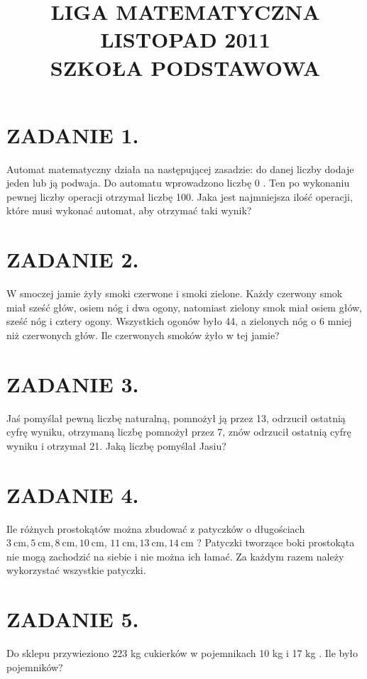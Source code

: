 \documentclass[10pt]{article}
\title{LIGA MATEMATYCZNA \\
 LISTOPAD 2011 \\
 SZKOŁA PODSTAWOWA }
\author{}
\date{}
\begin{document}
\maketitle
\section*{ZADANIE 1.}
Automat matematyczny działa na następującej zasadzie: do danej liczby dodaje jeden lub ją podwaja. Do automatu wprowadzono liczbę 0 . Ten po wykonaniu pewnej liczby operacji otrzymał liczbę 100. Jaka jest najmniejsza ilość operacji, które musi wykonać automat, aby otrzymać taki wynik?

\section*{ZADANIE 2.}
W smoczej jamie żyły smoki czerwone i smoki zielone. Każdy czerwony smok miał sześć głów, osiem nóg i dwa ogony, natomiast zielony smok miał osiem głów, sześć nóg i cztery ogony. Wszystkich ogonów było 44, a zielonych nóg o 6 mniej niż czerwonych głów. Ile czerwonych smoków żyło w tej jamie?

\section*{ZADANIE 3.}
Jaś pomyślał pewną liczbę naturalną, pomnożył ją przez 13, odrzucił ostatnią cyfrę wyniku, otrzymaną liczbę pomnożył przez 7, znów odrzucił ostatnią cyfrę wyniku i otrzymał 21. Jaką liczbę pomyślał Jasiu?

\section*{ZADANIE 4.}
Ile różnych prostokątów można zbudować z patyczków o długościach \(3 \mathrm{~cm}, 5 \mathrm{~cm}, 8 \mathrm{~cm}, 10 \mathrm{~cm}\), \(11 \mathrm{~cm}, 13 \mathrm{~cm}, 14 \mathrm{~cm}\) ? Patyczki tworzące boki prostokąta nie mogą zachodzić na siebie i nie można ich łamać. Za każdym razem należy wykorzystać wszystkie patyczki.

\section*{ZADANIE 5.}
Do sklepu przywieziono 223 kg cukierków w pojemnikach 10 kg i 17 kg . Ile było pojemników?
\end{document}
